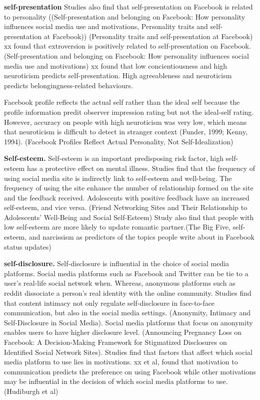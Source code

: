  \textbf{self-presentation} Studies also find that self-presentation on Facebook is related to personality ((Self-presentation and belonging on Facebook: How personality influences social media use and motivations, Personality traits and self-presentation at Facebook)) (Personality traits and self-presentation at Facebook) xx found that extroversion is positively related to self-presentation on Facebook.  (Self-presentation and belonging on Facebook: How personality influences social media use and motivations) xx found that low concientiousness and high neuroticism predicts self-presentation. High agreeableness and neuroticism predicts belongingness-related behaviours.

Facebook profile reflects the actual self rather than the ideal self because the profile information predit observer impression rating but not the ideal-self rating. However, accuracy on people with high neuroticism was very low, which means that neuroticism is difficult to detect in stranger context (Funder, 1999; Kenny, 1994). (Facebook Profiles Reflect Actual Personality, Not Self-Idealization)


\textbf{Self-esteem.}
Self-esteem is an important predisposing risk factor, high self-esteem has a protective effect on mental illness. Studies find that the frequency of using social media site is indirectly link to self-esteem and well-being. The frequency of using the site enhance the number of relationship formed on the site and the feedback received. Adolescents with positive feedback have an increased self-esteem, and vice versa. (Friend Networking Sites and Their Relationship to Adolescents’ Well-Being and Social Self-Esteem) Study also find that people with low self-esteem are more likely to update romantic partner.(The Big Five, self-esteem, and narcissism as predictors of the topics people write about in Facebook status updates)


\textbf{self-disclosure.}
Self-disclosure is influential in the choice of social media platforms. Social media platforms such as Facebook and Twitter can be tie to a user's real-life social network when. Whereas, anonymous platforms such as reddit dissociate a person's real identity with the online community. Studies find that content intimacy not only regulate self-disclosure in face-to-face communication, but also in the social media settings.  (Anonymity, Intimacy and Self-Disclosure in Social Media). Social media platforms that focus on anonymity enables users to have higher disclosure level. (Announcing Pregnancy Loss on Facebook: A Decision-Making Framework for Stigmatized Disclosures on Identified Social Network Sites). Studies find that factors that affect which social media platform to use lies in motivations. xx et al, found that motivation to communication predicts the preference on using Facebook while other motivations may be influential in the decision of which social media platforms to use. (Hudiburgh et al) 


